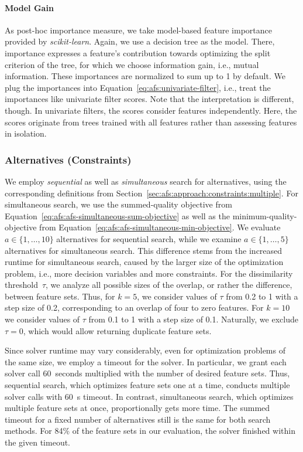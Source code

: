 \documentclass{article}
\theoremstyle{definition}
\begin{document}
\paragraph{Model Gain}

As post-hoc importance measure, we take model-based feature importance provided by \emph{scikit-learn}.
Again, we use a decision tree as the model.
There, importance expresses a feature's contribution towards optimizing the split criterion of the tree, for which we choose information gain, i.e., mutual information.
These importances are normalized to sum up to 1 by default.
We plug the importances into Equation~\ref{eq:afs:univariate-filter}, i.e., treat the importances like univariate filter scores.
Note that the interpretation is different, though.
In univariate filters, the scores consider features independently.
Here, the scores originate from trees trained with all features rather than assessing features in isolation.

\subsubsection{Alternatives (Constraints)}
\label{sec:afs:experimental-design:approaches:alternatives}

We employ \emph{sequential} as well as \emph{simultaneous} search for alternatives, using the corresponding definitions from Section~\ref{sec:afs:approach:constraints:multiple}.
For simultaneous search, we use the summed-quality objective from Equation~\ref{eq:afs:afs-simultaneous-sum-objective} as well as the minimum-quality-objective from Equation~\ref{eq:afs:afs-simultaneous-min-objective}.
We evaluate $a \in \{1, \dots, 10\}$ alternatives for sequential search, while we examine $a \in \{1, \dots, 5\}$ alternatives for simultaneous search.
This difference stems from the increased runtime for simultaneous search, caused by the larger size of the optimization problem, i.e., more decision variables and more constraints.
For the dissimilarity threshold~$\tau$, we analyze all possible sizes of the overlap, or rather the difference, between feature sets.
Thus, for $k=5$, we consider values of $\tau$ from 0.2 to 1 with a step size of 0.2, corresponding to an overlap of four to zero features.
For $k=10$ we consider values of $\tau$ from 0.1 to 1 with a step size of 0.1.
Naturally, we exclude $\tau = 0$, which would allow returning duplicate feature sets.

Since solver runtime may vary considerably, even for optimization problems of the same size, we employ a timeout for the solver.
In particular, we grant each solver call 60~seconds multiplied with the number of desired feature sets.
Thus, sequential search, which optimizes feature sets one at a time, conducts multiple solver calls with 60~s timeout.
In contrast, simultaneous search, which optimizes multiple feature sets at once, proportionally gets more time.
The summed timeout for a fixed number of alternatives still is the same for both search methods.
For 84\% of the feature sets in our evaluation, the solver finished within the given timeout.
\end{document}
